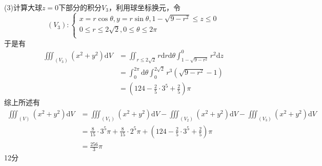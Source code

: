 \documentclass[hideanswer=false,
	enfont=newtxtext,
	zhfont=empty,
	mathfont=newtxmath,
]{cmcthesis}
\begin{document}
\begin{answer}
\begin{solution}
(3)计算大球$z=0$下部分的积分$V_3$，利用球坐标换元，令
	\[
	\left(V_3\right):\left\{\begin{array}{l}
	x=r\cos\theta ,y=r\sin\theta ,1-\sqrt{9-r^2}\leq z\leq 0\\
	0\leq r\leq 2\sqrt{2},0\leq\theta\leq 2\pi\\
	\end{array}\right. 
	\]
于是有
\begin{align*}
	\iiint_{\left(V_3\right)}{\left(x^2+y^2\right)\mathrm{d}V}&=\iint_{r\leq 2\sqrt{2}}{r\mathrm{d}r}\mathrm{d}\theta\int_{1-\sqrt{9-r^2}}^0{r^2\mathrm{d}z}\\
	&=\int_0^{2\pi}{\mathrm{d}\theta}\int_0^{2\sqrt{2}}{r^3\left(\sqrt{9-r^2}-1\right)}\\
	&=\left(124-\frac{2}{5}\cdot 3^5+\frac{2}{5}\right)\pi 
\end{align*}
综上所述有
\begin{align*}
	\iiint _ { ( V ) } \left( x ^ { 2 } + y ^ { 2 } \right) \mathrm { d } V& = \iiint _ { \left( V _ { 1 } \right) } \left( x ^ { 2 } + y ^ { 2 } \right) \mathrm { d } V - \iiint _ { \left( V _ { 2 } \right) } \left( x ^ { 2 } + y ^ { 2 } \right) \mathrm { d } V - \iiint _ { \left( V _ { 3 } \right) } \left( x ^ { 2 } + y ^ { 2 } \right) \mathrm { d } V\\
	&= \frac { 8 } { 15 } \cdot 3 ^ { 5 } \pi+\frac { 8 } { 15 } \cdot 2^ { 5 } \pi+\left(124-\frac{2}{5}\cdot 3^5+\frac{2}{5}\right)\pi\\
	&=\frac { 256 } { 3 } \pi
\end{align*}
\hfill\dotfill 12分
	\end{solution}
	\end{answer}
\end{document}
